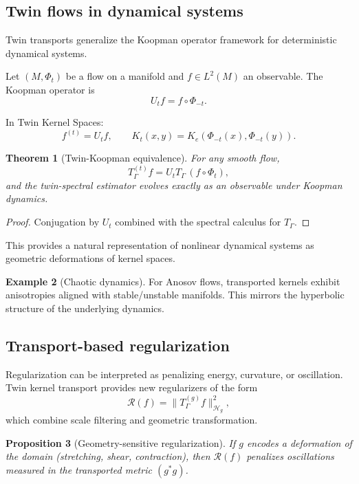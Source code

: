 \documentclass[11pt]{article}
\newtheorem{theorem}{Theorem}[section]
\newtheorem{proposition}[theorem]{Proposition}
\theoremstyle{definition}
\newtheorem{example}[theorem]{Example}
\begin{document}
\subsection{Twin flows in dynamical systems}

Twin transports generalize the Koopman operator framework for deterministic dynamical systems.

Let $(M,\Phi_t)$ be a flow on a manifold and $f\in L^2(M)$ an observable.
The Koopman operator is
\[
U_t f = f\circ\Phi_{-t}.
\]

In Twin Kernel Spaces:
\[
f^{(t)} = U_t f,\qquad
K_t(x,y)=K_e(\Phi_{-t}(x),\Phi_{-t}(y)).
\]

\begin{theorem}[Twin-Koopman equivalence]
	For any smooth flow,
	\[
	T_\Gamma^{(t)} f
	= U_t T_\Gamma\,(f\circ\Phi_t),
	\]
	and the twin-spectral estimator evolves exactly as an observable under Koopman dynamics.
\end{theorem}

\begin{proof}
	Conjugation by $U_t$ combined with the spectral calculus for $T_\Gamma$.
\end{proof}

This provides a natural representation of nonlinear dynamical systems as geometric deformations of kernel spaces.

\begin{example}[Chaotic dynamics]
	For Anosov flows, transported kernels exhibit anisotropies aligned with stable/unstable manifolds.
	This mirrors the hyperbolic structure of the underlying dynamics.
\end{example}

\subsection{Transport-based regularization}

Regularization can be interpreted as penalizing energy, curvature, or oscillation.
Twin kernel transport provides new regularizers of the form
\[
\mathcal{R}(f)
= \|T_\Gamma^{(g)} f\|_{\mathcal{H}_g}^2,
\]
which combine scale filtering and geometric transformation.

\begin{proposition}[Geometry-sensitive regularization]
	If $g$ encodes a deformation of the domain (stretching, shear, contraction), then $\mathcal{R}(f)$ penalizes oscillations measured in the transported metric $(g^\ast g)$.
\end{proposition}
\end{document}
